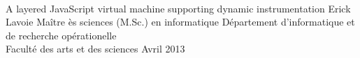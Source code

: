 \documentclass[letterpaper,9pt]{report}
\begin{document}


% 


\newpage
\addtocounter{page}{-1}
\thispagestyle{empty}
\vspace{1cm}
\ \\
\newpage
\titrememoire
    {A layered JavaScript virtual machine supporting dynamic instrumentation}
	{Erick Lavoie}
	{Ma\^itre \`es sciences (M.Sc.) en informatique}
	{D\'epartement d'informatique et de recherche op\'erationelle\\
    Facult\'e des arts et des sciences}
	{Avril}
    {2013}



%

%

%









%





% 
\newpage
\addtocounter{page}{-1}
\thispagestyle{empty}
\vspace{1cm}
\ \\
\end{document}

